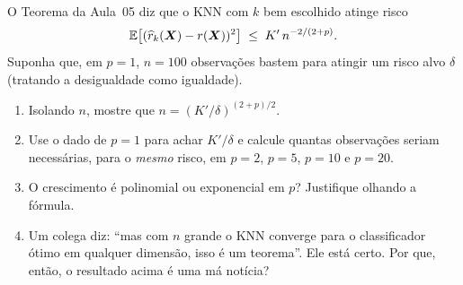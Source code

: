 \documentclass[11pt,a4paper]{article}
\begin{document}

\begin{exercicio}
O Teorema da Aula~05 diz que o KNN com $k$ bem escolhido atinge risco
\[
  \mathbb{E}\big[(\widehat{r}_k(\bm{X})-r(\bm{X}))^2\big] \;\le\; K'\,n^{-2/(2+p)} .
\]
Suponha que, em $p=1$, $n=100$ observações bastem para atingir um risco alvo
$\delta$ (tratando a desigualdade como igualdade).
\begin{enumerate}[label=(\alph*),leftmargin=1.1cm]
  \item Isolando $n$, mostre que $n=(K'/\delta)^{(2+p)/2}$.
  \item Use o dado de $p=1$ para achar $K'/\delta$ e calcule quantas observações
        seriam necessárias, para o \emph{mesmo} risco, em $p=2$, $p=5$, $p=10$ e
        $p=20$.
  \item O crescimento é polinomial ou exponencial em $p$? Justifique olhando a
        fórmula.
  \item Um colega diz: ``mas com $n$ grande o KNN converge para o classificador
        ótimo em qualquer dimensão, isso é um teorema''. Ele está certo. Por que,
        então, o resultado acima é uma má notícia?
\end{enumerate}
\end{exercicio}
\end{document}
